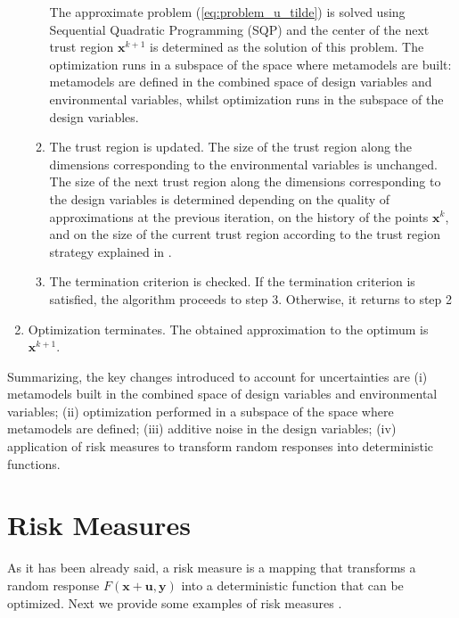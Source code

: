 \documentclass{llncs}
\begin{document}
\begin{enumerate}
\begin{enumerate}[label=(\alph*)]
    The approximate problem (\ref{eq:problem_u_tilde}) is solved using Sequential Quadratic Programming (SQP) and the center of the next trust region $\pmb x^{k+1}$ is determined as the solution of this problem. The optimization runs in a subspace of the space where metamodels are built: metamodels are defined in the combined space of design variables and environmental variables, whilst optimization runs in the subspace of the design variables.
    \item The trust region is updated. The size of the trust region along the dimensions corresponding to the environmental variables is unchanged. The size of the next trust region along the dimensions corresponding to the design variables is determined depending on the quality of approximations at the previous iteration, on the history of the points $\pmb x^k$, and on the size of the current trust region according to the trust region strategy explained in \cite{KeulenToropovMarkine1996}.
    \item The termination criterion is checked. If the termination criterion is satisfied, the algorithm proceeds to step 3. Otherwise, it returns to step 2
  \end{enumerate}
  \item Optimization terminates. The obtained approximation to the optimum is $\pmb x^{k+1}$.
\end{enumerate}

Summarizing, the key changes introduced to account for uncertainties are (i) metamodels built in the combined space of design variables and environmental variables; (ii) optimization performed in a subspace of the space where metamodels are defined; (iii) additive noise in the design variables; (iv) application of risk measures to transform random responses into deterministic functions.

\section{Risk Measures}
\label{sec:risk}

As it has been already said, a risk measure is a mapping that transforms a random response $F(\pmb x+ \pmb u,\pmb y)$  into a deterministic function that can be optimized. Next we provide some examples of risk measures \cite{RockafellarUryasev2000,SchillingsSchulz2015}.
\end{document}
